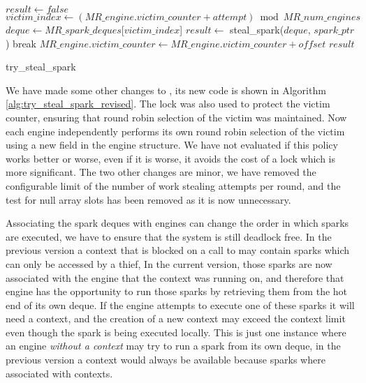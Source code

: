 \begin{algorithm}
\begin{algorithmic}[1]
  \State $result \gets false$
    \State $victim\_index \gets
        (MR\_engine.victim\_counter + attempt) \bmod MR\_num\_engines$
    \State $deque \gets
       MR\_spark\_deques$[$victim\_index$]
    \State $result \gets$ steal\_spark($deque$, $spark\_ptr$)
      \State break
    \EndIf
  \EndFor
  \State $MR\_engine.victim\_counter \gets
    MR\_engine.victim\_counter + offset$
  \State \Return $result$
\EndProcedure
\end{algorithmic}
\caption{try\_steal\_spark}
\label{alg:try_steal_spark_revised}
\end{algorithm}

We have made some other changes to \trystealspark,
its new code is shown in Algorithm \ref{alg:try_steal_spark_revised}.
The lock was also used to protect the victim counter,
ensuring that round robin selection of the victim was maintained.
Now each engine independently performs its own round robin selection of the
victim using a new field  in the engine structure.
We have not evaluated if this policy works better or worse,
even if it is worse,
it avoids the cost of a lock which is more significant.
The two other changes are minor,
we have removed the configurable limit of the number of work stealing
attempts per round,
and the test for null array slots has been removed as it is now unnecessary.

Associating the spark deques with engines can change the order in which
sparks are executed,
we have to ensure that the system is still deadlock free.
In the previous version
a context that is blocked on a call to \wait may contain sparks
which can only be accessed by a thief,
In the current version,
those sparks are now associated with the engine that the context was running
on,
and therefore that engine has the opportunity to run those sparks by
retrieving them from the hot end of its own deque.
If the engine attempts to execute one of these sparks it will need a
context,
and the creation of a new context may exceed the context limit even though
the spark is being executed locally.
This is just one instance where an engine \emph{without a context}
may try to run a spark from its own deque,
in the previous version a context would always be available because sparks
where associated with contexts.

